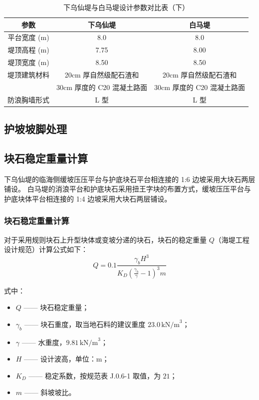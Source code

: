 \documentclass[UTF8, a4paper, 12pt]{ctexart} %
\begin{document}
\begin{table}[h]
    \centering
    \caption{下乌仙堤与白马堤设计参数对比表（下）}
    \begin{tabular}{|c|c|c|}
        \hline
        \textbf{参数} & \textbf{下乌仙堤} & \textbf{白马堤} \\ \hline
        平台宽度 (m) & 8.0 & 8.0 \\ \hline
        堤顶高程 (m) & 7.75 & 8.00 \\ \hline
        堤顶宽度 (m) & 8.50 & 8.50 \\ \hline
        堤顶建筑材料 & 20cm 厚自然级配石渣和 &20cm 厚自然级配石渣和\\ 
        & 30cm 厚度的 C20 混凝土路面 &  30cm 厚度的 C20 混凝土路面\\ \hline
        防浪胸墙形式 & L 型 & L 型 \\ \hline
    \end{tabular}
    \label{tab:west_south_dike_comparison_part2}
\end{table}



\subsection{护坡坡脚处理}
\subsection{块石稳定重量计算}

下乌仙堤的临海侧缓坡压压平台与护底块石平台相连接的 1:6 边坡采用大块石两层铺设。
白马堤的消浪平台和护底块石采用扭王字块的布置方式，缓坡压压平台与护底块体平台相连接的 1:4 边坡采用大块石两层铺设。

\subsubsection{块石稳定重量计算}

对于采用规则块石上升型块体或变坡分递的块石，块石的稳定重量 $Q$（海堤工程设计规范）计算公式如下：
\[
Q = 0.1 \frac{\gamma_b H^3}{K_D \left( \frac{\gamma_b}{\gamma} - 1 \right)^3 m}
\]

式中：
\begin{itemize}
    \item $Q$ —— 块石稳定重量；
    \item $\gamma_b$ —— 块石重度，取当地石料的建议重度 $23.0\,\text{kN/m}^3$；
    \item $\gamma$ —— 水重度，$9.81\,\text{kN/m}^3$；
    \item $H$ —— 设计波高，单位：$\text{m}$；
    \item $K_D$ —— 稳定系数，按规范表 J.0.6-1 取值，为 $21$；
    \item $m$ —— 斜坡坡比。
\end{itemize}
\end{document}
